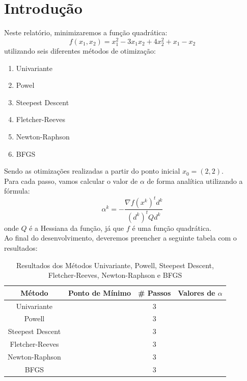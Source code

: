 \documentclass[a4paper, 12pt]{article}
\begin{document}
\newpage

\newpage

\thispagestyle{empty}

\newpage

\section{Introdução}
Neste relatório, minimizaremos a função quadrática:
\[
f(x_1, x_2) = x_1^2 - 3x_1x_2 + 4x_2^2 + x_1 - x_2
\]
utilizando seis diferentes métodos de otimização:

\begin{enumerate}
    \item  Univariante 
    \item Powel
    \item Steepest Descent
    \item Fletcher-Reeves
    \item Newton-Raphson
    \item BFGS
\end{enumerate}    

Sendo as otimizações realizadas a partir do ponto inicial \(x_0 = (2, 2)\).\\

Para cada passo, vamos calcular o valor de \( \alpha \) de forma analítica utilizando a fórmula:
\[
\alpha^k = -\frac{\nabla f(x^k)^t d^k}{(d^k)^t Q d^k}
\]
onde \( Q \) é a Hessiana da função, já que \( f \) é uma função quadrática.\\

Ao final do desenvolvimento, deveremos preencher a seguinte tabela com o resultados:

\begin{table}[H]
\centering
\begin{tabular}{|c|c|c|c|}
\hline
\textbf{Método}       & \textbf{Ponto de Mínimo} & \textbf{\# Passos} & \textbf{Valores de \( \alpha \)} \\ \hline
Univariante           &        & 3                  &            \\ \hline
Powell                &              & 3                  &                 \\ \hline
Steepest Descent      &            & 3                  &            \\ \hline
Fletcher-Reeves       &             & 3                  &             \\ \hline
Newton-Raphson      &             & 3                  &             \\ \hline
BFGS      &             & 3                  &            \\ \hline
\end{tabular}
\caption{Resultados dos Métodos Univariante, Powell, Steepest Descent, Fletcher-Reeves, Newton-Raphson e BFGS}
\end{table}
\end{document}
